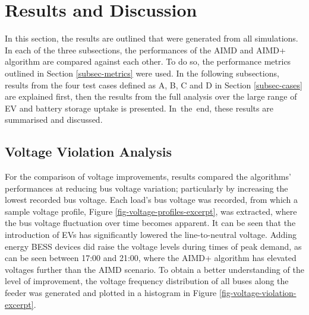 \section{Results and Discussion}
\label{ch4:sec:results-and-discussion}

In this section, the results are outlined that were generated from all simulations. In each of the three subsections, the performances of the AIMD and AIMD+ algorithm are compared against each other. To do so, the performance metrics outlined in Section \ref{subsec-metrics} were used. In the following subsections, results from the four test cases defined as {A}, {B}, {C} and {D} in Section \ref{subsec-cases} are explained first, then the results from the full analysis over the large range of EV and battery storage uptake is presented. In~the~end, these results are summarised and discussed.

\subsection{Voltage Violation Analysis}

For the comparison of voltage improvements, results compared the algorithms' performances at reducing bus voltage variation; particularly by increasing the lowest recorded bus voltage. Each load's bus voltage was recorded, from which a sample voltage profile, Figure \ref{fig-voltage-profiles-excerpt}, was extracted, where the bus voltage fluctuation over time becomes apparent. It can be seen that the introduction of EVs has significantly lowered the line-to-neutral voltage. Adding energy BESS devices did raise the voltage levels during times of peak demand, as can be seen between 17:00 and 21:00, where the AIMD+ algorithm has elevated voltages further than the AIMD scenario. To obtain a better understanding of the level of improvement, the voltage frequency distribution of all buses along the feeder was generated and plotted in a histogram in Figure \ref{fig-voltage-violation-excerpt}.

